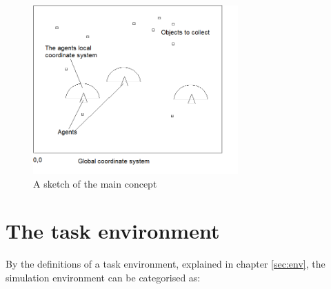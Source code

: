 \documentclass[10pt,a4paper,DIV=11]{scrreprt}
\begin{document}
\begin{center}
	\begin{figure}[H]
		\centering
		\includegraphics[width=0.7\textwidth,scale=1.0]{files/main-concept.png}  
		\caption{A sketch of the main concept}
		\label{fig:concept-main}
	\end{figure}
\end{center}

\section{The task environment}
By the definitions of a task environment, explained in chapter \ref{sec:env}, the simulation environment can be categorised as: \\

   \\
\\
\end{document}
